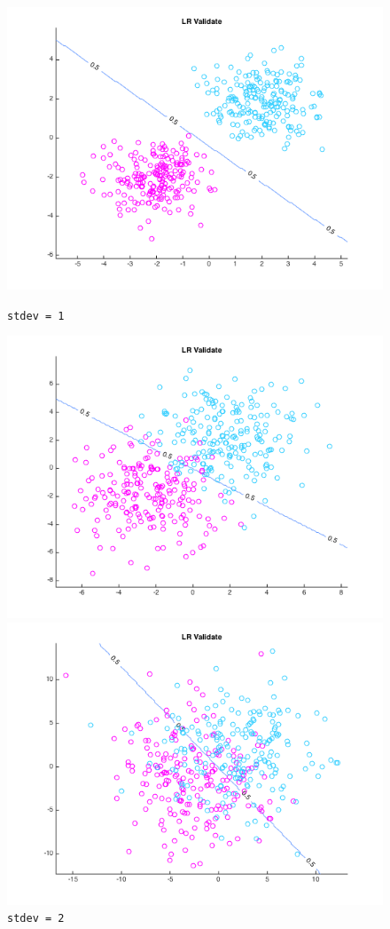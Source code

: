\documentclass[10pt,letterpaper]{article}
\begin{document}
\begin{figure}[!htb]
  \includegraphics[width=\linewidth]{figures/sd1v0.png}
  \caption{\texttt{stdev = 1}}\label{fig:gradDifQ}
\endminipage\hfill
{}
  \includegraphics[width=\linewidth]{figures/sd2v0.png}
  \caption{\texttt{stdev = 2}}\label{fig:gradDifN}
\endminipage\hfill
{}
  \includegraphics[width=\linewidth]{figures/sd4v0.png}

\end{figure}
\end{document}
